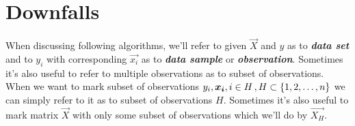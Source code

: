 \section{Downfalls}


\begin{note}
    When discussing following algorithms, we'll refer to given $\vec{X}$ and $y$ as to \textbf{\textit{data set}} and to $y_i$ with corresponding $\vec{x_i}$ as to \textbf{\textit{data sample}} or \textbf{\textit{observation}}. Sometimes it's also useful to refer to multiple observations as to subset of observations. When we want to mark subset of observations  
    $y_i\\, \vec{x_i}\\, i \in H\,, H \subset \{{1,2,\ldots , n\}}$ we can simply refer to it as to subset of observations $H$. Sometimes it's also useful to mark matrix $\vec{X}$ with only some subset of observations which we'll do by $\vec{X_H}$.  
\end{note}
